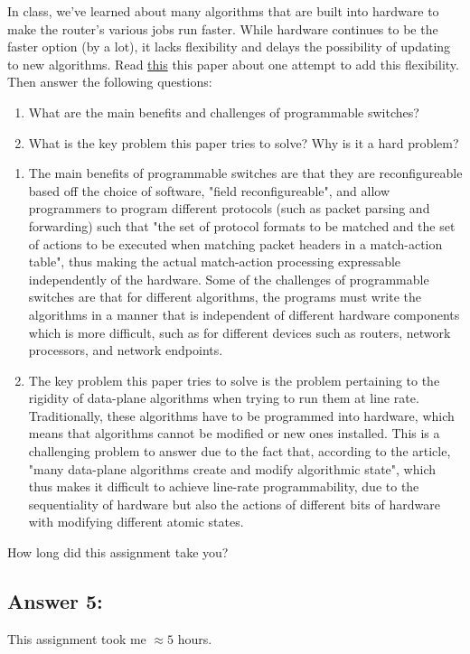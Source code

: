 \documentclass[10pt]{article}
\newenvironment{problem}[2][Problem]{\begin{trivlist}
\item[\hskip \labelsep {\bfseries #1}\hskip \labelsep {\bfseries #2.}]}{\end{trivlist}}
\begin{document}
\newpage
\begin{problem}{4: Reading}
In class, we've learned about many algorithms that are built into hardware to make the router's various jobs run faster. While hardware continues to be the faster option (by a lot), it lacks flexibility and delays the possibility of updating to new algorithms. Read \href{https://cs.nyu.edu/~anirudh/domino-sigcomm.pdf}{this} this paper about one attempt to add this flexibility. Then answer the following questions:

\begin{enumerate}
    \item What are the main benefits and challenges of programmable switches?
    \item What is the key problem this paper tries to solve? Why is it a hard problem?
\end{enumerate}
\end{problem}
\begin{enumerate}
    \item The main benefits of programmable switches are that they are reconfigureable based off the choice of software, "field reconfigureable", and allow programmers to program different protocols (such as packet parsing and forwarding) such that "the set of protocol formats to be matched and the set of actions to be executed when matching packet headers in a match-action table", thus making the actual match-action processing expressable independently of the hardware. Some of the challenges of programmable switches are that for different algorithms, the programs must write the algorithms in a manner that is independent of different hardware components which is more difficult, such as for different devices such as routers, network processors, and network endpoints.
    \item The key problem this paper tries to solve is the problem pertaining to the rigidity of data-plane algorithms when trying to run them at line rate. Traditionally, these algorithms have to be programmed into hardware, which means that algorithms cannot be modified or new ones installed. This is a challenging problem to answer due to the fact that, according to the article, "many data-plane algorithms create and modify algorithmic state", which thus makes it difficult to achieve line-rate programmability, due to the sequentiality of hardware but also the actions of different bits of hardware with modifying different atomic states.
\end{enumerate}
\begin{problem}{5}
How long did this assignment take you?
\end{problem}
\subsection*{Answer 5:}
This assignment took me $\approx 5$ hours.
\end{document}
